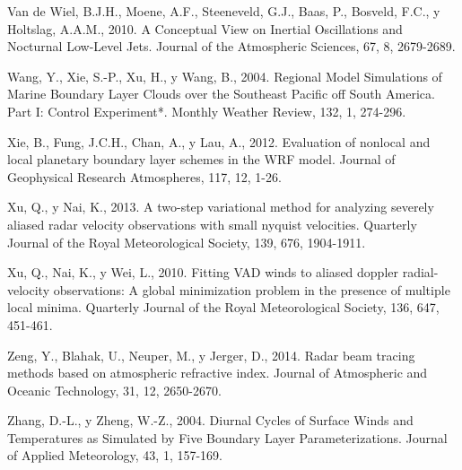 \documentclass[12pt,spanish,oneside, a4paper]{book}
\begin{document}
\hypertarget{ref-VanDeWiel2010}{}
Van de Wiel, B.J.H., Moene, A.F., Steeneveld, G.J., Baas, P., Bosveld,
F.C., y Holtslag, A.A.M., 2010. A Conceptual View on Inertial
Oscillations and Nocturnal Low-Level Jets. Journal of the Atmospheric
Sciences, 67, 8, 2679-2689.

\hypertarget{ref-Wang2004}{}
Wang, Y., Xie, S.-P., Xu, H., y Wang, B., 2004. Regional Model
Simulations of Marine Boundary Layer Clouds over the Southeast Pacific
off South America. Part I: Control Experiment*. Monthly Weather Review,
132, 1, 274-296.

\hypertarget{ref-Xie2012}{}
Xie, B., Fung, J.C.H., Chan, A., y Lau, A., 2012. Evaluation of nonlocal
and local planetary boundary layer schemes in the WRF model. Journal of
Geophysical Research Atmospheres, 117, 12, 1-26.

\hypertarget{ref-Xu2013}{}
Xu, Q., y Nai, K., 2013. A two-step variational method for analyzing
severely aliased radar velocity observations with small nyquist
velocities. Quarterly Journal of the Royal Meteorological Society, 139,
676, 1904-1911.

\hypertarget{ref-Xu2010}{}
Xu, Q., Nai, K., y Wei, L., 2010. Fitting VAD winds to aliased doppler
radial-velocity observations: A global minimization problem in the
presence of multiple local minima. Quarterly Journal of the Royal
Meteorological Society, 136, 647, 451-461.

\hypertarget{ref-Zeng2014}{}
Zeng, Y., Blahak, U., Neuper, M., y Jerger, D., 2014. Radar beam tracing
methods based on atmospheric refractive index. Journal of Atmospheric
and Oceanic Technology, 31, 12, 2650-2670.

\hypertarget{ref-Zhang2004}{}
Zhang, D.-L., y Zheng, W.-Z., 2004. Diurnal Cycles of Surface Winds and
Temperatures as Simulated by Five Boundary Layer Parameterizations.
Journal of Applied Meteorology, 43, 1, 157-169.
\end{document}
